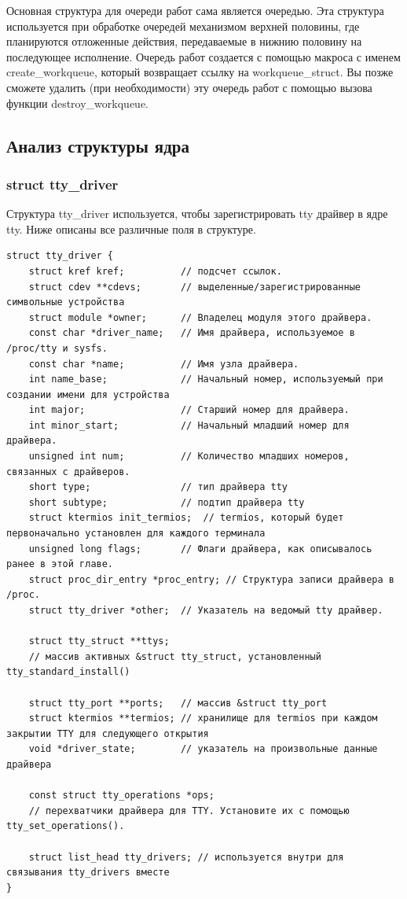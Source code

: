 Основная структура для очереди работ сама является очередью. Эта структура используется при обработке очередей механизмом верхней половины, где планируются отложенные действия, передаваемые в нижнию половину на последующее исполнение. Очередь работ создается с помощью макроса с именем create\_workqueue, который возвращает ссылку на workqueue\_struct. Вы позже сможете удалить (при необходимости) эту очередь работ с помощью вызова функции destroy\_workqueue.

\subsection{Анализ структуры ядра}
\subsubsection{struct tty\_driver}
Структура tty\_driver используется, чтобы зарегистрировать tty драйвер в ядре tty. Ниже описаны все различные поля в структуре.
\begin{lstlisting}[caption = Описание struct tty\_driver, label = {lst:21}]
struct tty_driver {
	struct kref kref;          // подсчет ссылок.
	struct cdev **cdevs;       // выделенные/зарегистрированные символьные устройства
	struct module *owner;      // Владелец модуля этого драйвера.
	const char *driver_name;   // Имя драйвера, используемое в /proc/tty и sysfs.
	const char *name;          // Имя узла драйвера.
    int	name_base;             // Начальный номер, используемый при создании имени для устройства
	int	major;                 // Старший номер для драйвера.
	int	minor_start;           // Начальный младший номер для драйвера. 
	unsigned int num;          // Количество младших номеров, связанных с драйверов. 
	short type;                // тип драйвера tty
	short subtype;             // подтип драйвера tty
	struct ktermios init_termios;  // termios, который будет первоначально установлен для каждого терминала
	unsigned long flags;       // Флаги драйвера, как описывалось ранее в этой главе.
	struct proc_dir_entry *proc_entry; // Структура записи драйвера в /proc. 
	struct tty_driver *other;  // Указатель на ведомый tty драйвер.

	struct tty_struct **ttys;  
    // массив активных &struct tty_struct, установленный tty_standard_install() 
    
	struct tty_port **ports;   // массив &struct tty_port
	struct ktermios **termios; // хранилище для termios при каждом закрытии TTY для следующего открытия 
	void *driver_state;        // указатель на произвольные данные драйвера 

	const struct tty_operations *ops; 
    // перехватчики драйвера для TTY. Установите их с помощью tty_set_operations().
    
	struct list_head tty_drivers; // используется внутри для связывания tty_drivers вместе 
}
\end{lstlisting}

